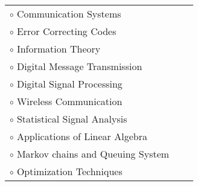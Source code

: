 \documentclass[a4paper,10pt]{article}
\begin{document}
 \begin{tabular}{p{3.5in}p{5in}p{3.5in}}
     $\circ$ Communication Systems \\
     $\circ$ Error Correcting Codes \\
    $\circ$ Information Theory \\
    $\circ$ Digital Message Transmission \\
    $\circ$ Digital Signal Processing \\
    $\circ$ Wireless Communication \\
    $\circ$ Statistical Signal Analysis \\
    $\circ$ Applications of Linear Algebra \\
    $\circ$ Markov chains and Queuing System \\
    $\circ$ Optimization Techniques \\
\end{tabular}
    
\end{document}
